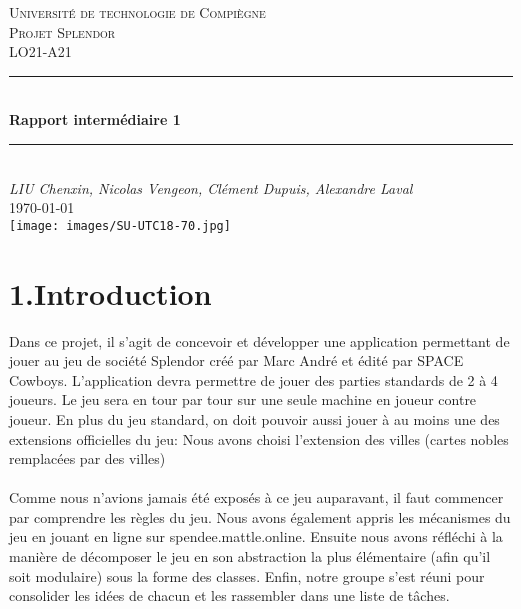 \documentclass[a4paper]{article}
\begin{document}
\begin{titlepage}

\newcommand{\HRule}{\rule{\linewidth}{0.5mm}} 							%
\center 
 
\textsc{\LARGE Université de technologie de Compiègne}\\[1cm]

\textsc{\Large Projet Splendor}\\[0.2cm]
\textsc{\large LO21-A21}\\[1cm] 										%
\HRule \\[0.8cm]
{ \huge \bfseries Rapport intermédiaire 1}\\[0.7cm]								%
\HRule \\[2cm]
\large
\emph{LIU Chenxin, Nicolas Vengeon, Clément Dupuis, Alexandre Laval}\\
{\large \today}\\[13cm]
\texttt{[image: images/SU-UTC18-70.jpg]}\\[1cm] 	%
\vfill 
\end{titlepage}


\section*{1.Introduction}

Dans ce projet, il s’agit de concevoir et développer une application permettant de jouer au jeu de 
société Splendor créé par Marc André et édité par SPACE Cowboys. 
L’application devra permettre de jouer des parties standards de 2 à 4 joueurs. Le jeu sera en tour par tour sur une seule machine en joueur contre joueur. En plus du jeu standard, on doit pouvoir aussi jouer
à au moins une des extensions officielles du jeu: Nous avons choisi l'extension des villes (cartes nobles remplacées par des villes)\\
\\
Comme nous n'avions jamais été exposés à ce jeu auparavant, il faut commencer par comprendre les règles du jeu. 
Nous avons également appris les mécanismes du jeu en jouant en ligne sur spendee.mattle.online.
Ensuite nous avons réfléchi à la manière de décomposer le jeu en son abstraction la plus élémentaire 
(afin qu'il soit modulaire) sous la forme des classes. 
Enfin, notre groupe s'est réuni pour consolider les idées de chacun et les rassembler dans une liste de tâches.
\end{document}
